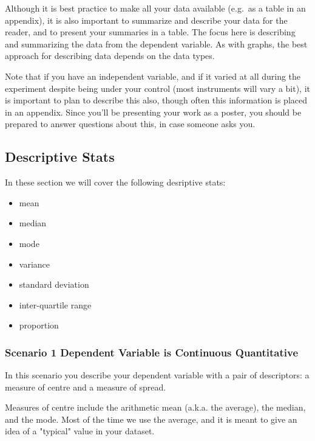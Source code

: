 \documentclass[
]{book}
\providecommand{\tightlist}{%
  \setlength{\itemsep}{0pt}\setlength{\parskip}{0pt}}
\begin{document}
Although it is best practice to make all your data available (e.g.~as a table in an appendix), it is also important to summarize and describe your data for the reader, and to present your summaries in a table. The focus here is describing and summarizing the data from the dependent variable. As with graphs, the best approach for describing data depends on the data types.

Note that if you have an independent variable, and if it varied at all during the experiment despite being under your control (most instruments will vary a bit), it is important to plan to describe this also, though often this information is placed in an appendix. Since you'll be presenting your work as a poster, you should be prepared to answer questions about this, in case someone asks you.

\hypertarget{descriptive-stats}{%
\subsection*{Descriptive Stats}\label{descriptive-stats}}

In these section we will cover the following desriptive stats:

\begin{itemize}
\tightlist
\item
  mean
\item
  median
\item
  mode
\item
  variance
\item
  standard deviation
\item
  inter-quartile range
\item
  proportion
\end{itemize}

\hypertarget{scenario-1-dependent-variable-is-continuous-quantitative}{%
\subsubsection*{Scenario 1 Dependent Variable is Continuous Quantitative}\label{scenario-1-dependent-variable-is-continuous-quantitative}}

In this scenario you describe your dependent variable with a pair of descriptors: a measure of centre and a measure of spread.

Measures of centre include the arithmetic mean (a.k.a. the average), the median, and the mode. Most of the time we use the average, and it is meant to give an idea of a "typical" value in your dataset.
\end{document}
